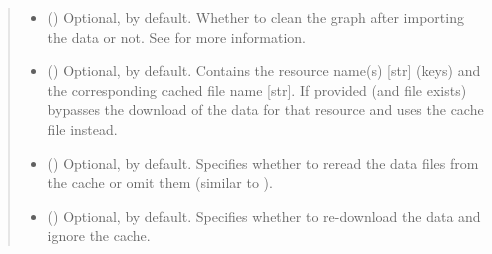 \documentclass[letterpaper,10pt,english]{sphinxmanual}
\begin{document}
\begin{fulllineitems}
\begin{fulllineitems}
\begin{quote}
\begin{description}
\begin{itemize}
\item {} 
 () \textendash{} Optional,  by default. Whether to clean the graph
after importing the data or not. See
{\hyperref[\detokenize{main:pypath.main.PyPath.clean_graph}]{}} for more
information.

\item {} 
 () \textendash{} Optional, \sphinxcode{\sphinxupquote{\{\}}} by default. Contains the resource name(s)
{[}str{]} (keys) and the corresponding cached file name {[}str{]}.
If provided (and file exists) bypasses the download of the
data for that resource and uses the cache file instead.

\item {} 
 () \textendash{} Optional,  by default. Specifies whether to reread
the data files from the cache or omit them (similar to
).

\item {} 
 () \textendash{} Optional,  by default. Specifies whether to
re-download the data and ignore the cache.

\end{itemize}

\end{description}\end{quote}

\end{fulllineitems}



\end{fulllineitems}
\end{document}
